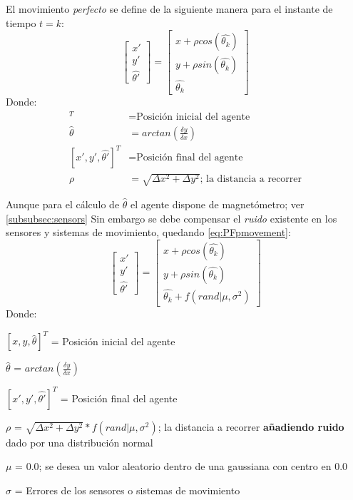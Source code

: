 El movimiento \emph{perfecto} se define de la siguiente manera para el instante de tiempo $t=k$:
\begin{equation}
\label{eq:PFpmovement}
\begin{bmatrix}
x'\\ 
y'\\ 
\hat{\theta'}
\end{bmatrix} = 
\begin{bmatrix}
x + \rho cos(\hat{\theta_k})\\
y + \rho sin(\hat{\theta_k})\\
\hat{\theta_k}
\end{bmatrix}
\end{equation}
Donde:
\begin{align*}
[x,y,\hat{\theta}]^T &= \text{Posición inicial del agente}\\
\hat{ \theta } &= arctan(\frac{\delta y}{\delta x})\\
[x',y',\hat{\theta'}]^T &= \text{Posición final del agente}\\
\rho &= \sqrt{\Delta x^2 + \Delta y^2}\text{; la distancia a recorrer}
\end{align*}

Aunque para el cálculo de $\hat{\theta}$ el agente dispone de magnetómetro; ver \ref{subsubsec:sensors}
Sin embargo se debe compensar el \emph{ruido} existente en los sensores y sistemas de movimiento, quedando \ref{eq:PFpmovement}:
\begin{equation}
\label{eq:PFnmovement}
\begin{bmatrix}
x'\\ 
y'\\ 
\hat{\theta'}
\end{bmatrix} = 
\begin{bmatrix}
x + \rho cos(\hat{\theta_k})\\
y + \rho sin(\hat{\theta_k})\\
\hat{\theta_k} + f(rand | \mu, \sigma^2)
\end{bmatrix}
\end{equation}
Donde:

\begin{minipage}{\columnwidth}
\begin{center}
\begin{description}
\item $[x,y,\hat{\theta}]^T$ = Posición inicial del agente
\item $\hat{ \theta }$ = $arctan(\frac{\delta y}{\delta x})$
\item $[x',y',\hat{\theta'}]^T$ = Posición final del agente
\item $\rho$ = $\sqrt{\Delta x^2 + \Delta y^2} * f(rand | \mu, \sigma^2)$; la distancia a recorrer \textbf{añadiendo ruido} dado por una distribución normal
\item $\mu$ = $0.0$; se desea un valor aleatorio dentro de una gaussiana con centro en 0.0
\item $\sigma$ = Errores de los sensores o sistemas de movimiento
\end{description}
\end{center}
\end{minipage}



